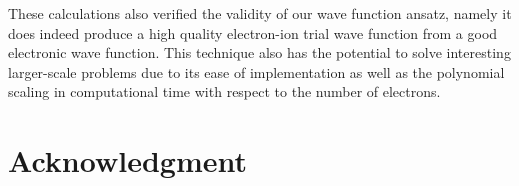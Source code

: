 \documentclass[pra,superscriptaddress,groupedaddress,twocolumn]{revtex4}
\begin{document}
These calculations also verified the validity of our wave function ansatz, namely it does indeed produce a high quality electron-ion trial wave function from a good electronic wave function. This technique also has the potential to solve interesting larger-scale problems due to its ease of implementation as well as the polynomial scaling in computational time with respect to the number of electrons.  %

\section{Acknowledgment}



\end{document}
